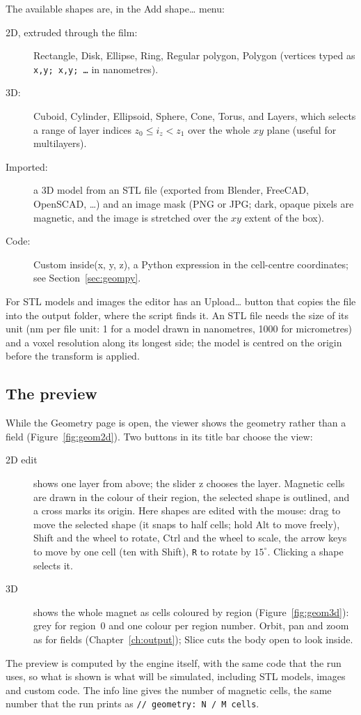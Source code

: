 \documentclass[11pt,a4paper,oneside]{book}
\newcommand{\code}[1]{\texttt{#1}}
\renewcommand{\_}{\textunderscore\allowbreak}
\newcommand{\menu}[1]{\textsf{#1}}
\begin{document}
The available shapes are, in the \menu{Add shape\ldots} menu:
\begin{description}
\item[2D, extruded through the film:] Rectangle, Disk, Ellipse, Ring, Regular polygon, Polygon (vertices typed as
\code{x,y; x,y; \ldots} in nanometres).
\item[3D:] Cuboid, Cylinder, Ellipsoid, Sphere, Cone, Torus, and Layers, which selects a range of layer indices
$z_0 \le i_z < z_1$ over the whole $xy$ plane (useful for multilayers).
\item[Imported:] a 3D model from an STL file (exported from Blender, FreeCAD, OpenSCAD, \ldots) and an image mask
(PNG or JPG; dark, opaque pixels are magnetic, and the image is stretched over the $xy$ extent of the box).
\item[Code:] \menu{Custom inside(x, y, z)}, a Python expression in the cell-centre coordinates; see
Section~\ref{sec:geompy}.
\end{description}
For STL models and images the editor has an \menu{Upload\ldots} button that copies the file into the output
folder, where the script finds it. An STL file needs the size of its unit (\menu{nm per file unit}: 1 for a model
drawn in nanometres, 1000 for micrometres) and a voxel resolution along its longest side; the model is centred on
the origin before the transform is applied.

\subsection{The preview}

While the Geometry page is open, the viewer shows the geometry rather than a field (Figure~\ref{fig:geom2d}). Two
buttons in its title bar choose the view:
\begin{description}
\item[2D edit] shows one layer from above; the slider \menu{z} chooses the layer. Magnetic cells are drawn in
the colour of their region, the selected shape is outlined, and a cross marks its origin. Here shapes are edited
with the mouse: drag to move the selected shape (it snaps to half cells; hold Alt to move freely), Shift and the
wheel to rotate, Ctrl and the wheel to scale, the arrow keys to move by one cell (ten with Shift), \code{R} to
rotate by $15^\circ$. Clicking a shape selects it.
\item[3D] shows the whole magnet as cells coloured by region (Figure~\ref{fig:geom3d}): grey for region~0 and
one colour per region number. Orbit, pan and zoom as for fields (Chapter~\ref{ch:output}); \menu{Slice} cuts the body open to look
inside.
\end{description}
The preview is computed by the engine itself, with the same code that the run uses, so what is shown is what will
be simulated, including STL models, images and custom code. The info line gives the number of magnetic cells, the
same number that the run prints as \code{// geometry: N / M cells}.
\end{document}
